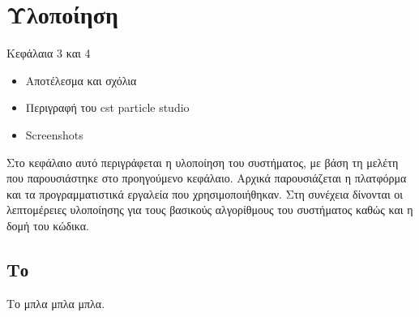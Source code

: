 \chapter{Υλοποίηση}
Κεφάλαια 3 και 4
\begin{itemize}
\item Αποτέλεσμα και σχόλια
\item Περιγραφή του cst particle studio
\item Screenshots
\end{itemize}
Στο κεφάλαιο αυτό περιγράφεται η υλοποίηση του συστήματος, με βάση
τη μελέτη που παρουσιάστηκε στο προηγούμενο κεφάλαιο. Αρχικά
παρουσιάζεται η πλατφόρμα και τα προγραμματιστικά εργαλεία που
χρησιμοποιήθηκαν. Στη συνέχεια δίνονται οι λεπτομέρειες υλοποίησης
για τους βασικούς αλγορίθμους του συστήματος καθώς και η δομή του
κώδικα.

\section{Το }
Το  μπλα μπλα μπλα.



